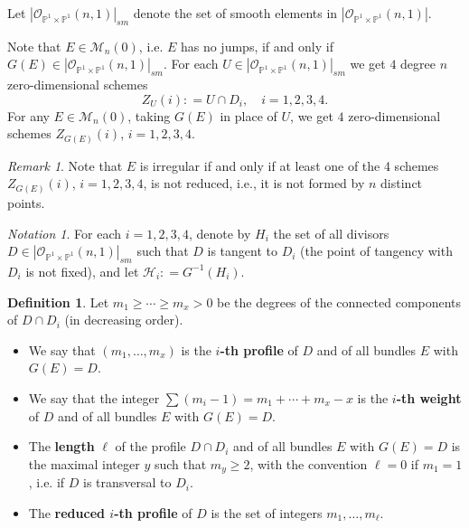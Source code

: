 \documentclass[10pt,a4paper]{amsart}
\theoremstyle{plain}
\theoremstyle{definition}
\newtheorem{definition}{Definition}
\theoremstyle{remark}
\newtheorem{remark}{Remark}
\newtheorem{notation}{Notation}
\newcommand{\ce}{\mathrel{\mathop:}=}
\begin{document}
Let  $|\mathcal O_{\mathbb P^1\times \mathbb P^1}(n,1)|_{sm}$ denote the set of smooth elements in $|\mathcal O_{\mathbb P^1\times \mathbb P^1}(n,1)|$.

 Note that $E\in \mathcal M_n(0)$, i.e. $E$ has no jumps, if and only if $G(E)\in |\mathcal O_{\mathbb P^1\times \mathbb P^1}(n,1)|_{sm}$. For each $U\in |\mathcal O_{\mathbb P^1\times \mathbb P^1}(n,1)|_{sm}$ we get $4$ degree $n$ zero-dimensional schemes
 $$Z_U(i)\ce U\cap D_i, \quad  i=1,2,3,4.$$
  For any $E\in \mathcal M_n(0)$, taking $G(E)$ in place of $U$,  we get $4$ zero-dimensional schemes $Z_{G(E)}(i)$, $i=1,2,3,4$.

  \begin{remark}
Note that $E$ is irregular if and only if at least one of the 4 schemes $Z_{G(E)}(i)$, $i=1,2,3,4$, is not reduced, i.e., it is not formed by $n$ distinct points.
\end{remark}

\begin{notation}\label{defH} For each $i=1,2,3,4$, denote by  $H_i$  the set of all divisors 
$D\in |\mathcal O_{\mathbb P^1\times \mathbb P^1}(n,1)|_{sm}$ such that $D$ is tangent to $D_i$ 
(the point of tangency with $D_i$ is not fixed), and let $\mathcal H_i\ce G^{-1}(H_i)$.
\end{notation}

\begin{definition}\label{weights}
Let $m_1\ge \cdots \ge m_x>0$ be the degrees  of the connected components of $D\cap D_i$
(in decreasing order).
\begin{itemize}
\item  We say that $(m_1,\dots ,m_x)$ is the {\bf $i$-th    profile} of $D$ and of all bundles $E$ with $G(E)=D$. 
 
\item  We say that the integer $\sum (m_i-1) =m_1+\cdots +m_x-x$ is the {\bf $i$-th weight} of $D$ and of all bundles $E$ with $G(E) =D$. 
 
\item  The {\bf length} $\ell$ of the profile $D\cap D_i$ and of all  bundles $E$ with $G(E)=D$
is the maximal integer $y$ such that $m_y\ge 2$, with the convention $\ell =0$ if $m_1=1$, i.e. if $D$ is transversal to $D_i$. 

\item The {\bf reduced $i$-th profile} of $D$
is the set of integers $m_1,\dots ,m_\ell$.
\end{itemize}
\end{definition}
\end{document}
